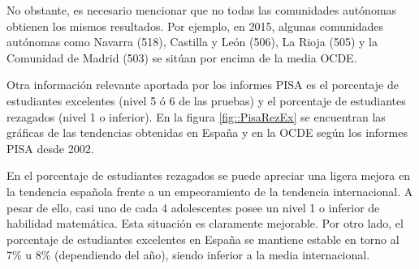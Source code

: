 No obstante, es necesario mencionar que no todas las comunidades autónomas obtienen los mismos resultados. 
%
Por ejemplo, en 2015, algunas comunidades autónomas como Navarra (518), Castilla y León (506), La Rioja (505) y la Comunidad de Madrid (503) se sitúan por encima de la media OCDE.


Otra información relevante aportada por los informes PISA es el porcentaje de estudiantes excelentes (nivel 5 ó 6 de las pruebas) y el porcentaje de estudiantes rezagados (nivel 1 o inferior).
%
En la figura \ref{fig::PisaRezEx} se encuentran las gráficas de las tendencias obtenidas en España y en la OCDE según los informes PISA desde 2002.



En el porcentaje de estudiantes rezagados se puede apreciar una ligera mejora en la tendencia española frente a un empeoramiento de la tendencia internacional.
%
A pesar de ello, casi uno de cada 4 adolescentes posee un nivel 1 o inferior de habilidad matemática. 
%
Esta situación es claramente mejorable.
%
Por otro lado, el porcentaje de estudiantes excelentes en España se mantiene estable en torno al 7\% u 8\% (dependiendo del año), siendo inferior a la media internacional.

